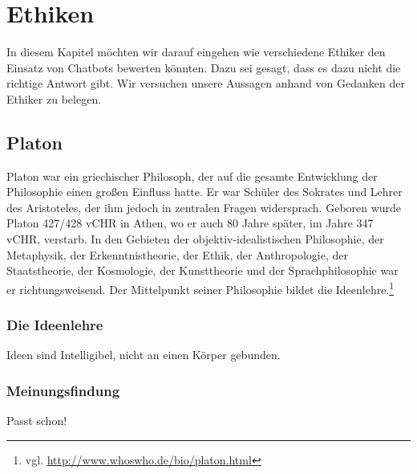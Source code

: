 \section{Ethiken}
In diesem Kapitel möchten wir darauf eingehen wie verschiedene Ethiker den Einsatz von Chatbots bewerten könnten. Dazu sei gesagt, dass es dazu nicht die richtige Antwort gibt. Wir versuchen unsere Aussagen anhand von Gedanken der Ethiker zu belegen. 


\subsection{Platon}
Platon war ein griechischer Philosoph, der auf die gesamte Entwicklung der Philosophie einen großen Einfluss hatte. Er war Schüler des Sokrates und Lehrer des Aristoteles, der ihm jedoch in zentralen Fragen widersprach. Geboren wurde Platon 427/428 \ac{vCHR} in Athen, wo er auch 80 Jahre später, im Jahre 347 \ac{vCHR}, verstarb. In den Gebieten der objektiv-idealistischen Philosophie, der Metaphysik, der Erkenntnistheorie, der Ethik, der Anthropologie, der Staatstheorie, der Kosmologie, der Kunsttheorie und der Sprachphilosophie war er richtungsweisend. Der Mittelpunkt seiner Philosophie bildet die Ideenlehre.\footnote{vgl. \url{http://www.whoswho.de/bio/platon.html}}

\subsubsection{Die Ideenlehre}
Ideen sind Intelligibel, nicht an einen Körper gebunden.
\subsubsection{Meinungsfindung}
Passt schon!






